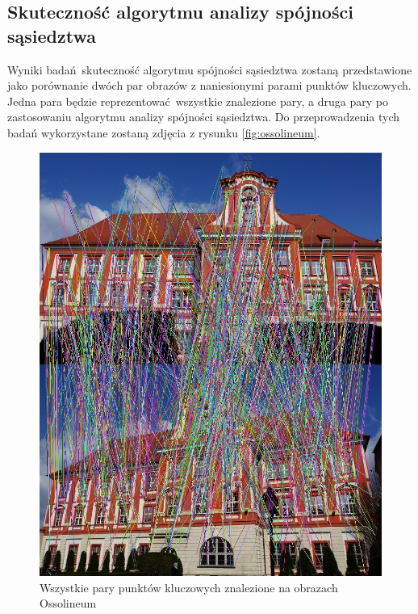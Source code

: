 \documentclass{article}
\begin{document}
	\subsection{Skuteczność algorytmu analizy spójności sąsiedztwa}
	Wyniki badań skuteczność algorytmu spójności sąsiedztwa zostaną przedstawione jako porównanie dwóch par obrazów z naniesionymi parami punktów kluczowych. Jedna para będzie reprezentować wszystkie znalezione pary, a druga pary po zastosowaniu algorytmu analizy spójności sąsiedztwa. Do przeprowadzenia tych badań wykorzystane zostaną zdjęcia z rysunku \ref{fig:ossolineum}.\\
	\begin{figure}[H]
		\centering
		\includegraphics[width=0.6\linewidth]{1allpairs.png}
		\caption{Wszystkie pary punktów kluczowych znalezione na obrazach Ossolineum}
	\end{figure}
\end{document}
